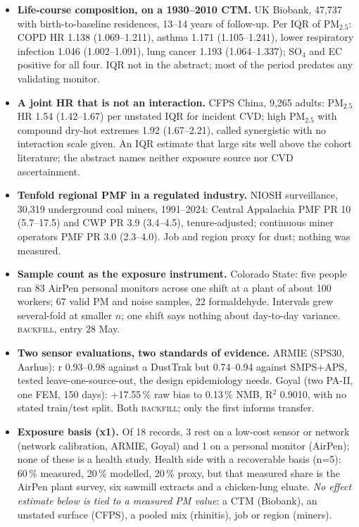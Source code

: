 \documentclass[10pt]{article}
\begin{document}
\footnotesize
\begin{itemize}

\item \textbf{Life-course composition, on a 1930--2010 CTM.} UK Biobank, 47,737 with birth-to-baseline residences, 13--14 years of follow-up. Per IQR of PM$_{2.5}$: COPD HR 1.138 (1.069--1.211), asthma 1.171 (1.105--1.241), lower respiratory infection 1.046 (1.002--1.091), lung cancer 1.193 (1.064--1.337); SO$_4$ and EC positive for all four. IQR not in the abstract; most of the period predates any validating monitor.

\item \textbf{A joint HR that is not an interaction.} CFPS China, 9,265 adults: PM$_{2.5}$ HR 1.54 (1.42--1.67) per unstated IQR for incident CVD; high PM$_{2.5}$ with compound dry-hot extremes 1.92 (1.67--2.21), called synergistic with no interaction scale given. An IQR estimate that large sits well above the cohort literature; the abstract names neither exposure source nor CVD ascertainment.

\item \textbf{Tenfold regional PMF in a regulated industry.} NIOSH surveillance, 30,319 underground coal miners, 1991--2024: Central Appalachia PMF PR 10 (5.7--17.5) and CWP PR 3.9 (3.4--4.5), tenure-adjusted; continuous miner operators PMF PR 3.0 (2.3--4.0). Job and region proxy for dust; nothing was measured.

\item \textbf{Sample count as the exposure instrument.} Colorado State: five people ran 83 AirPen personal monitors across one shift at a plant of about 100 workers; 67 valid PM and noise samples, 22 formaldehyde. Intervals grew several-fold at smaller $n$; one shift says nothing about day-to-day variance. \textsc{backfill}, entry 28 May.

\item \textbf{Two sensor evaluations, two standards of evidence.} ARMIE (SPS30, Aarhus): r 0.93--0.98 against a DustTrak but 0.74--0.94 against SMPS+APS, tested leave-one-source-out, the design epidemiology needs. Goyal (two PA-II, one FEM, 150 days): +17.55\,\% raw bias to 0.13\,\% NMB, R$^2$ 0.9010, with no stated train/test split. Both \textsc{backfill}; only the first informs transfer.

\item \textbf{Exposure basis (x1).} Of 18 records, 3 rest on a low-cost sensor or network (network calibration, ARMIE, Goyal) and 1 on a personal monitor (AirPen); none of these is a health study. Health side with a recoverable basis (n=5): 60\,\% measured, 20\,\% modelled, 20\,\% proxy, but that measured share is the AirPen plant survey, six sawmill extracts and a chicken-lung eluate. \emph{No effect estimate below is tied to a measured PM value}: a CTM (Biobank), an unstated surface (CFPS), a pooled mix (rhinitis), job or region (miners).

\end{itemize}
\end{document}
